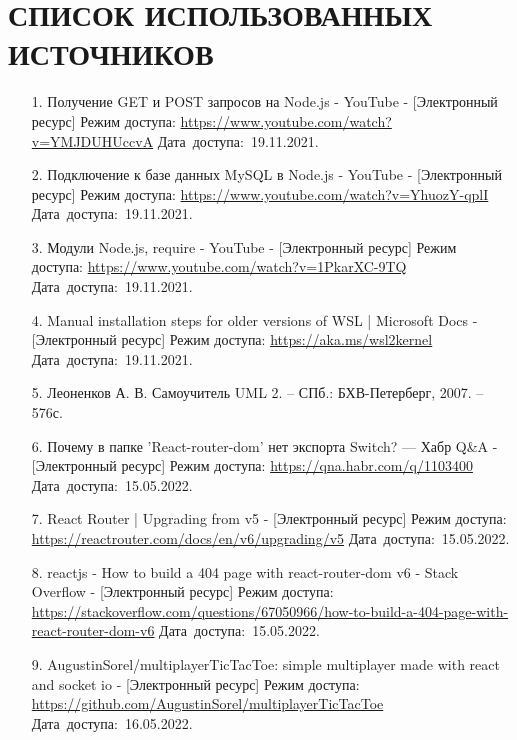 \documentclass[12pt, a4paper, simple]{eskdtext}
\begin{document}
    \section*{СПИСОК ИСПОЛЬЗОВАННЫХ ИСТОЧНИКОВ}
    \begin{enumerate}
        \item[1.] Получение GET и POST запросов на Node.js - YouTube
        - [Электронный ресурс]
        Режим доступа: \url{https://www.youtube.com/watch?v=YMJDUHUccvA}
        Дата~доступа:~19.11.2021.

        \item[2.] Подключение к базе данных MySQL в Node.js - YouTube
        - [Электронный ресурс]
        Режим доступа: \url{https://www.youtube.com/watch?v=YhuozY-qplI}
        Дата~доступа:~19.11.2021.

        \item[3.] Модули Node.js, require - YouTube
        - [Электронный ресурс]
        Режим доступа: \url{https://www.youtube.com/watch?v=1PkarXC-9TQ}
        Дата~доступа:~19.11.2021.

        \item[4.] Manual installation steps for older versions of WSL | Microsoft Docs
        - [Электронный ресурс]
        Режим доступа: \url{https://aka.ms/wsl2kernel}
        Дата~доступа:~19.11.2021.

        \item[5.] Леоненков А. В.
        Самоучитель UML 2. -- СПб.: БХВ-Петерберг, 2007. -- 576с.

        \item[6.] Почему в папке 'React-router-dom' нет экспорта Switch? — Хабр Q\&A
        - [Электронный ресурс]
        Режим доступа: \url{https://qna.habr.com/q/1103400}
        Дата~доступа:~15.05.2022.

        \item[7.] React Router | Upgrading from v5
        - [Электронный ресурс]
        Режим доступа: \url{https://reactrouter.com/docs/en/v6/upgrading/v5}
        Дата~доступа:~15.05.2022.

        \item[8.] reactjs - How to build a 404 page with react-router-dom v6 - Stack Overflow
        - [Электронный ресурс]
        Режим доступа: \url{https://stackoverflow.com/questions/67050966/how-to-build-a-404-page-with-react-router-dom-v6}
        Дата~доступа:~15.05.2022.

        \item[9.] AugustinSorel/multiplayerTicTacToe: simple multiplayer made with react and socket io
        - [Электронный ресурс]
        Режим доступа: \url{https://github.com/AugustinSorel/multiplayerTicTacToe}
        Дата~доступа:~16.05.2022.

    \end{enumerate}
    \newpage
\end{document}
